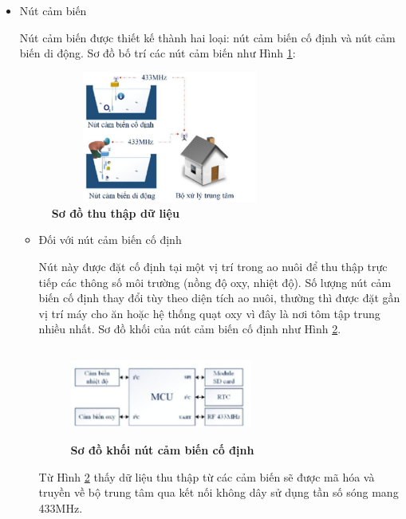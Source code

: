 \documentclass{article} %
\begin{document}
	\begin{itemize}
		\item Nút cảm biến
		
		Nút cảm  biến được thiết kế thành hai loại: nút cảm biến cố định và nút cảm biến di động. Sơ đồ bố trí các nút cảm biến như Hình \ref{sddulieu}:
		\begin{figure}[!ht]
			\centering
			\includegraphics[width=7.8cm,height=4.3cm]{Images/sddulieu.png}
			\caption[Sơ đồ thu thập dữ liệu\cite{khanhhe}]{\bfseries \fontsize{12pt}{0pt}\selectfont Sơ đồ thu thập dữ liệu\cite{khanhhe}}
			\label{sddulieu}
		\end{figure}
		\begin{itemize}[label=$\ast$]
			\item Đối với nút cảm biến cố định
			
			Nút này được đặt cố định tại một vị trí trong ao nuôi để thu thập trực tiếp các thông  số môi trường (nồng độ oxy, nhiệt độ). Số lượng nút cảm biến cố định thay đổi tùy theo diện tích ao nuôi, thường thì được đặt gần vị trí máy cho ăn hoặc hệ thống quạt oxy vì đây là nơi tôm tập trung nhiều nhất. Sơ đồ khối của nút cảm biến cố định như Hình \ref{nutcodinh}.
			
			\begin{figure}[!ht]
				\centering
				\includegraphics[width=6cm,height=3cm]{Images/nutcodinh.png}
				\caption[Sơ đồ khối nút cảm biến cố định\cite{khanhhe}]{\bfseries \fontsize{12pt}{0pt}\selectfont Sơ đồ khối nút cảm biến cố định\cite{khanhhe}}
				\label{nutcodinh}
			\end{figure}
			
			Từ Hình \ref{nutcodinh} thấy dữ liệu thu thập từ các cảm biến sẽ được mã hóa và truyền về bộ  trung tâm qua kết nối  không dây sử dụng tần số sóng mang 433MHz. 
			

\end{itemize}
\end{itemize}
\end{document}
